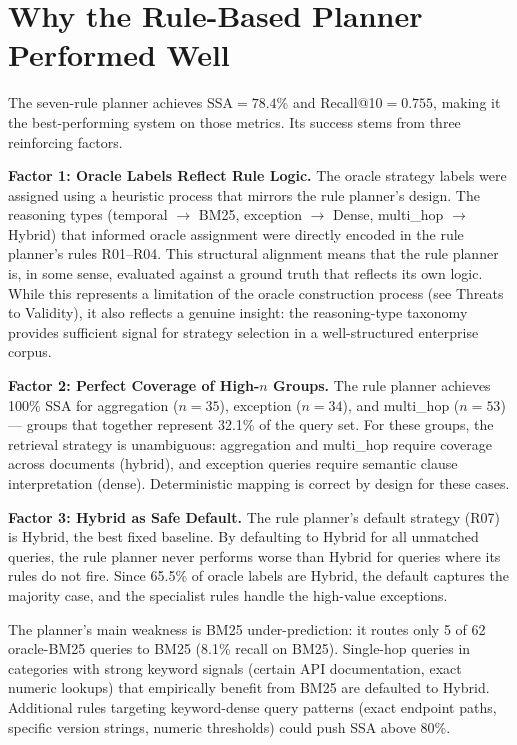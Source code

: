 \section{Why the Rule-Based Planner Performed Well}
\label{sec:disc_rule}

The seven-rule planner achieves SSA$={78.4\%}$ and Recall@10$={0.755}$, making it the best-performing system on those metrics. Its success stems from three reinforcing factors.

\textbf{Factor 1: Oracle Labels Reflect Rule Logic.} The oracle strategy labels were assigned using a heuristic process that mirrors the rule planner's design. The reasoning types (temporal $\rightarrow$ BM25, exception $\rightarrow$ Dense, multi\_hop $\rightarrow$ Hybrid) that informed oracle assignment were directly encoded in the rule planner's rules R01--R04. This structural alignment means that the rule planner is, in some sense, evaluated against a ground truth that reflects its own logic. While this represents a limitation of the oracle construction process (see Threats to Validity), it also reflects a genuine insight: the reasoning-type taxonomy provides sufficient signal for strategy selection in a well-structured enterprise corpus.

\textbf{Factor 2: Perfect Coverage of High-$n$ Groups.} The rule planner achieves 100\% SSA for aggregation ($n{=}35$), exception ($n{=}34$), and multi\_hop ($n{=}53$) --- groups that together represent 32.1\% of the query set. For these groups, the retrieval strategy is unambiguous: aggregation and multi\_hop require coverage across documents (hybrid), and exception queries require semantic clause interpretation (dense). Deterministic mapping is correct by design for these cases.

\textbf{Factor 3: Hybrid as Safe Default.} The rule planner's default strategy (R07) is Hybrid, the best fixed baseline. By defaulting to Hybrid for all unmatched queries, the rule planner never performs worse than Hybrid for queries where its rules do not fire. Since 65.5\% of oracle labels are Hybrid, the default captures the majority case, and the specialist rules handle the high-value exceptions.

The planner's main weakness is BM25 under-prediction: it routes only 5 of 62 oracle-BM25 queries to BM25 (8.1\% recall on BM25). Single-hop queries in categories with strong keyword signals (certain API documentation, exact numeric lookups) that empirically benefit from BM25 are defaulted to Hybrid. Additional rules targeting keyword-dense query patterns (exact endpoint paths, specific version strings, numeric thresholds) could push SSA above 80\%.

